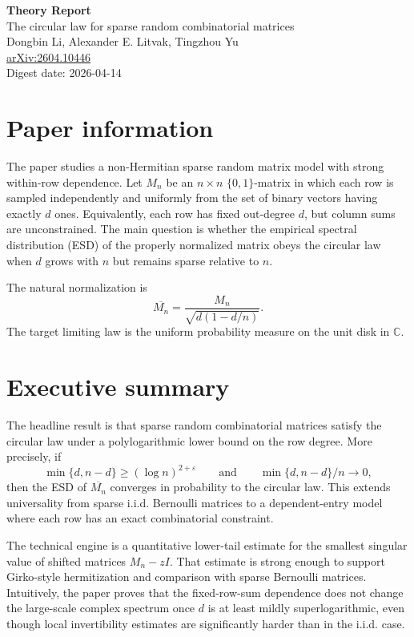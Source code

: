 \documentclass[11pt]{article}
\begin{document}
\begin{center}
{\LARGE \textbf{Theory Report}}\\[0.5em]
{\large The circular law for sparse random combinatorial matrices}\\[0.35em]
Dongbin Li, Alexander E. Litvak, Tingzhou Yu\\
\href{https://arxiv.org/abs/2604.10446}{arXiv:2604.10446}\\
Digest date: 2026-04-14
\end{center}

\section*{Paper information}
The paper studies a non-Hermitian sparse random matrix model with strong within-row dependence. Let $M_n$ be an $n\times n$ $\{0,1\}$-matrix in which each row is sampled independently and uniformly from the set of binary vectors having exactly $d$ ones. Equivalently, each row has fixed out-degree $d$, but column sums are unconstrained. The main question is whether the empirical spectral distribution (ESD) of the properly normalized matrix obeys the circular law when $d$ grows with $n$ but remains sparse relative to $n$.

The natural normalization is
\[
\overline{M_n}=\frac{M_n}{\sqrt{d(1-d/n)}}.
\]
The target limiting law is the uniform probability measure on the unit disk in $\mathbb C$.

\section*{Executive summary}
The headline result is that sparse random combinatorial matrices satisfy the circular law under a polylogarithmic lower bound on the row degree. More precisely, if
\[
\min\{d,n-d\}\ge (\log n)^{2+\varepsilon}
\qquad\text{and}\qquad
\min\{d,n-d\}/n\to 0,
\]
then the ESD of $\overline{M_n}$ converges in probability to the circular law. This extends universality from sparse i.i.d. Bernoulli matrices to a dependent-entry model where each row has an exact combinatorial constraint.

The technical engine is a quantitative lower-tail estimate for the smallest singular value of shifted matrices $M_n-zI$. That estimate is strong enough to support Girko-style hermitization and comparison with sparse Bernoulli matrices. Intuitively, the paper proves that the fixed-row-sum dependence does not change the large-scale complex spectrum once $d$ is at least mildly superlogarithmic, even though local invertibility estimates are significantly harder than in the i.i.d. case.
\end{document}
